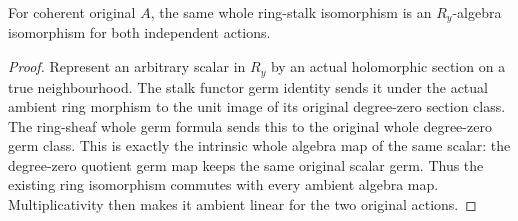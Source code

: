 \begin{theorem}
\label{hir:real-domain-actual-normal-associated-ring-sheaf-whole-algebra-equivalence}
\leanok
For coherent original $A$, the same whole ring-stalk isomorphism is an
$R_y$-algebra isomorphism for both independent actions.
\end{theorem}
\begin{proof}
Represent an arbitrary scalar in $R_y$ by an actual holomorphic section
on a true neighbourhood. The stalk functor germ identity sends it under
the actual ambient ring morphism to the unit image of its original
degree-zero section class. The ring-sheaf whole germ formula sends this
to the original whole degree-zero germ class. This is exactly the
intrinsic whole algebra map of the same scalar: the degree-zero quotient
germ map keeps the same original scalar germ. Thus the existing ring
isomorphism commutes with every ambient algebra map. Multiplicativity
then makes it ambient linear for the two original actions.
\end{proof}

